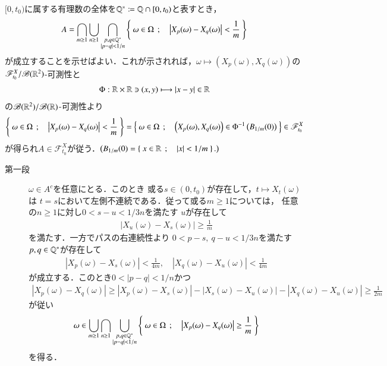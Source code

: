 \begin{prf}
	$[0,t_0)$に属する有理数の全体を$\mathbb{Q}^* \coloneqq \mathbb{Q} \cap [0,t_0)$と表すとき，
	\begin{align}
		A = \bigcap_{m \geq 1} \bigcup_{n \geq 1} \bigcap_{\substack{p,q \in \mathbb{Q}^* \\ |p-q| < 1/n}}
		\left\{\ \omega \in \Omega\ \, ; \quad \left|X_p(\omega) - X_q(\omega) \right| < \frac{1}{m}\ \right\}
	\end{align}
	が成立することを示せばよい．これが示されれば，$\omega \longmapsto \left(X_p(\omega), X_q(\omega) \right)$の
	$\mathscr{F}^X_{t_0}/\mathscr{B}(\mathbb{R}^2)$-可測性と
	\begin{align}
		\Phi:\mathbb{R} \times \mathbb{R} \ni (x,y) \longmapsto |x-y| \in \mathbb{R}
	\end{align}
	の$\mathscr{B}(\mathbb{R}^2)/\mathscr{B}(\mathbb{R})$-可測性より
	\begin{align}
		\left\{\ \omega \in \Omega\ \, ; \quad \left|X_p(\omega) - X_q(\omega) \right| < \frac{1}{m}\ \right\}
		= \left\{\ \omega \in \Omega\ \, ; \quad \left(X_p(\omega), X_q(\omega) \right) \in 
		\Phi^{-1}\left(B_{1/m}(0)\right)\ \right\}
		\in \mathscr{F}^X_{t_0}
	\end{align}
	が得られ$A \in \mathscr{F}^X_{t_0}$が従う．$\left(B_{1/m}(0) = \left\{\ x \in \mathbb{R}\ \, ; \quad |x| < 1/m\ \right\}.\right)$
	\begin{description}
		\item[第一段]
			$\omega \in A^c$を任意にとる．このとき
			或る$s \in (0,t_0)$が存在して，$t \longmapsto X_t(\omega)$は
			$t = s$において左側不連続である．従って或る$m \geq 1$については，
			任意の$n \geq 1$に対し$0< s-u < 1/3n$を満たす
			$u$が存在して
			\begin{align}
				\left|X_u(\omega) - X_s(\omega) \right| \geq \frac{1}{m}
			\end{align}
			を満たす．一方でパスの右連続性より
			$0 < p - s,\ q - u < 1/3n$を満たす$p,q \in \mathbb{Q}^*$が存在して
			\begin{align}
				\left|X_p(\omega) - X_s(\omega) \right| < \frac{1}{4m},
				\quad \left|X_q(\omega) - X_u(\omega) \right| < \frac{1}{4m}
			\end{align}
			が成立する．このとき$0 < |p - q| < 1/n$かつ
			\begin{align}
				\left|X_p(\omega) - X_q(\omega) \right|
				\geq \left|X_p(\omega) - X_s(\omega) \right|
					- \left|X_s(\omega) - X_u(\omega) \right|
					- \left|X_q(\omega) - X_u(\omega) \right|
				\geq \frac{1}{2m}
			\end{align}
			が従い
			\begin{align}
				\omega \in \bigcup_{m \geq 1} \bigcap_{n \geq 1} \bigcup_{\substack{p,q \in \mathbb{Q}^* \\ |p-q| < 1/n}}
		\left\{\ \omega \in \Omega\ \, ; \quad \left|X_p(\omega) - X_q(\omega) \right| \geq \frac{1}{m}\ \right\}
			\end{align}
			を得る．
		

\end{description}
\end{prf}
